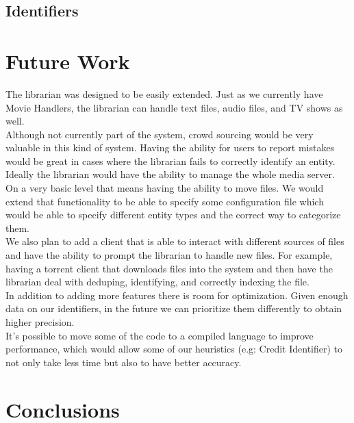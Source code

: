 \documentclass[paper=a4, fontsize=11pt]{scrartcl} %
\numberwithin{equation}{section} %
\numberwithin{figure}{section} %
\numberwithin{table}{section} %
\begin{document}
\subsection{Identifiers}
\label{sec:identifiers}



\section{Future Work}
\label{sec:future-work}

The librarian was designed to be easily extended. Just as we currently have Movie Handlers, the librarian can handle text files, audio files, and TV shows as well. \\

Although not currently part of the system, crowd sourcing would be very valuable in this kind of system. Having the ability for users to report mistakes would be great in cases where the librarian fails to correctly identify an entity. \\

Ideally the librarian would have the ability to manage the whole media server. On a very basic level that means having the ability to move files. We would extend that functionality to be able to specify some configuration file which would be able to specify different entity types and the correct way to categorize them. \\

We also plan to add a client that is able to interact with different sources of files and have the ability to prompt the librarian to handle new files. For example, having a torrent client that downloads files into the system and then have the librarian deal with deduping, identifying, and correctly indexing the file. \\

In addition to adding more features there is room for optimization. Given enough data on our identifiers, in the future we can prioritize them differently to obtain higher precision. \\

It's possible to move some of the code to a compiled language to improve performance, which would allow some of our heuristics (e.g: Credit Identifier) to not only take less time but also to have better accuracy. \\ 


\section{Conclusions}
\label{sec:conclusions}

\end{document}
